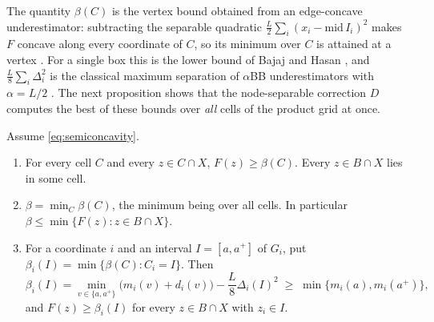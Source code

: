 The quantity $\beta(C)$ is the vertex bound obtained from an
edge-concave underestimator: subtracting the separable quadratic
$\frac L2\sum_i(x_i-\mathrm{mid}\,I_i)^2$ makes $F$ concave along every
coordinate of $C$, so its minimum over $C$ is attained at a vertex
\cite{Tardella2004,MeyerFloudas2005,Hasan2018}. For a single box this is the
lower bound of Bajaj and Hasan \cite[Theorem~1]{BajajHasan2020}, and
$\frac L8\sum_i\Delta_i^2$ is the classical maximum separation of
$\alpha$BB underestimators with $\alpha=L/2$
\cite{MaranasFloudas1994,AdjimanEtAl1998}. The next proposition shows that
the node-separable correction $D$ computes the best of these bounds over
\emph{all} cells of the product grid at once.

\begin{proposition}
\label{prop:lc-cellwise}
Assume \eqref{eq:semiconcavity}.
\begin{enumerate}
\item[(a)] For every cell $C$ and every $z\in C\cap X$, $F(z)\ge\beta(C)$.
Every $z\in B\cap X$ lies in some cell.
\item[(b)] $\beta=\min_C\beta(C)$, the minimum being over all cells. In
particular $\beta\le\min\{F(z):z\in B\cap X\}$.
\item[(c)] For a coordinate $i$ and an interval $I=[a,a^+]$ of $G_i$, put
$\beta_i(I)=\min\{\beta(C):C_i=I\}$. Then
\[
\beta_i(I)=\min_{v\in\{a,a^+\}}\bigl(m_i(v)+d_i(v)\bigr)
-\frac L8\Delta_i(I)^2
\;\ge\;\min\{m_i(a),m_i(a^+)\},
\]
and $F(z)\ge\beta_i(I)$ for every $z\in B\cap X$ with $z_i\in I$.
\end{enumerate}
\end{proposition}

